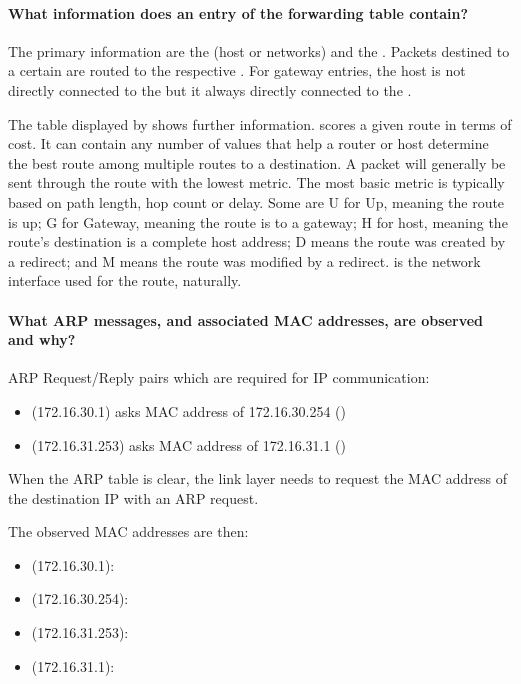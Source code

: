 \documentclass[compilation.tex]{subfiles}
\begin{document}
\paragraph{What information does an entry of the forwarding table contain?}
The primary information are the  (host or networks) and the . Packets destined to a certain  are routed to the respective . For gateway entries, the host is not directly connected to the  but it always directly connected to the .

The table displayed by  shows further information.  scores a given route in terms of cost. It can contain any number of values that help a router or host determine the best route among multiple routes to a destination. A packet will generally be sent through the route with the lowest metric. The most basic metric is typically based on path length, hop count or delay. Some  are U for Up, meaning the route is up; G for Gateway, meaning the route is to a gateway; H for host, meaning the route's destination is a complete host address; D means the route was created by a redirect; and M means the route was modified by a redirect.  is the network interface used for the route, naturally.

\paragraph{What ARP messages, and associated MAC addresses, are observed and why?}
ARP Request/Reply pairs which are required for IP communication:
\begin{itemize}[noitemsep,leftmargin=*,topsep=0pt]
\item {} (172.16.30.1) asks MAC address of 172.16.30.254 ()
\item {} (172.16.31.253) asks MAC address of 172.16.31.1 ()
\end{itemize}
When the ARP table is clear, the link layer needs to request the MAC address of the destination IP with an ARP request.

The observed MAC addresses are then:
\begin{itemize}[noitemsep,leftmargin=*,topsep=0pt]
\item {} (172.16.30.1): 
\item {} (172.16.30.254): 
\item {} (172.16.31.253): 
\item {} (172.16.31.1): 
\end{itemize}
\end{document}
